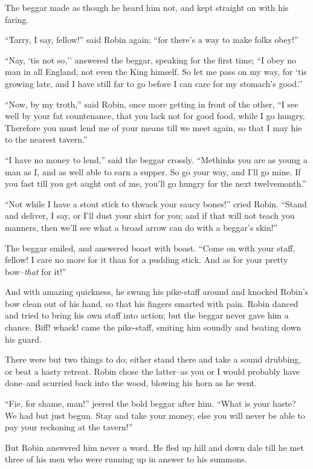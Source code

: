 The beggar made as though he heard him not, and kept straight on with
his faring.

``Tarry, I say, fellow!'' said Robin again; ``for there's a way to make
folks obey!''

``Nay, `tis not so,'' answered the beggar, speaking for the first time;
``I obey no man in all England, not even the King himself. So let me
pass on my way, for `tis growing late, and I have still far to go before
I can care for my stomach's good.''

``Now, by my troth,'' said Robin, once more getting in front of the
other, ``I see well by your fat countenance, that you lack not for good
food, while I go hungry. Therefore you must lend me of your means till
we meet again, so that I may hie to the nearest tavern.''

``I have no money to lend,'' said the beggar crossly. ``Methinks you are
as young a man as I, and as well able to earn a supper. So go your way,
and I'll go mine. If you fast till you get aught out of me, you'll go
hungry for the next twelvemonth.''

``Not while I have a stout stick to thwack your saucy bones!'' cried
Robin. ``Stand and deliver, I say, or I'll dust your shirt for you; and
if that will not teach you manners, then we'll see what a broad arrow
can do with a beggar's skin!''

The beggar smiled, and answered boast with boast. ``Come on with your
staff, fellow! I care no more for it than for a pudding stick. And as
for your pretty bow--\emph{that} for it!''

And with amazing quickness, he swung his pike-staff around and knocked
Robin's bow clean out of his hand, so that his fingers smarted with
pain. Robin danced and tried to bring his own staff into action; but the
beggar never gave him a chance. Biff! whack! came the pike-staff,
smiting him soundly and beating down his guard.

There were but two things to do; either stand there and take a sound
drubbing, or beat a hasty retreat. Robin chose the latter--as you or I
would probably have done--and scurried back into the wood, blowing his
horn as he went.

``Fie, for shame, man!'' jeered the bold beggar after him. ``What is
your haste? We had but just begun. Stay and take your money, else you
will never be able to pay your reckoning at the tavern!''

But Robin answered him never a word. He fled up hill and down dale till
he met three of his men who were running up in answer to his summons.

